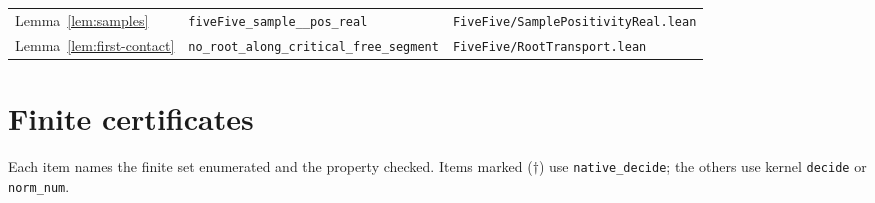 \documentclass[10pt]{article}
\theoremstyle{definition}
\theoremstyle{remark}
\begin{document}
\begin{small}
\begin{longtable}{@{}p{3.6cm}p{6.3cm}p{5.4cm}@{}}
Lemma~\ref{lem:samples} & \texttt{five\allowbreak Five\_\allowbreak sample\_\allowbreak *\_\allowbreak pos\_\allowbreak real} & \texttt{Five\allowbreak Five/\allowbreak Sample\allowbreak Positivity\allowbreak Real.\allowbreak lean}\\
Lemma~\ref{lem:first-contact} & \texttt{no\_\allowbreak root\_\allowbreak along\_\allowbreak critical\_\allowbreak free\_\allowbreak segment} & \texttt{Five\allowbreak Five/\allowbreak Root\allowbreak Transport.\allowbreak lean}\\
\bottomrule
\end{longtable}
\end{small}

\section{Finite certificates}\label{app:certificates}

Each item names the finite set enumerated and the property checked.
Items marked ($\dagger$) use \texttt{native\_\allowbreak decide}; the others use kernel
\texttt{decide} or \texttt{norm\_\allowbreak num}.
\end{document}
